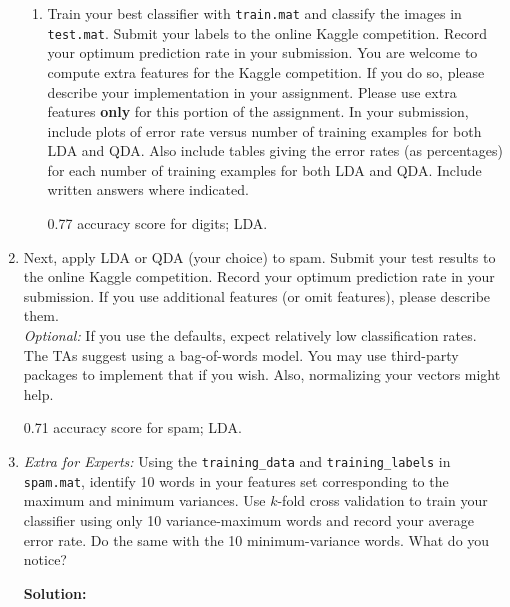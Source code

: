 \documentclass{article}
\newcommand{\solution}{\textbf{Solution: }}
\begin{document}
\begin{enumerate}[label=(\alph*)]
\begin{enumerate}[label=(\roman*)]
      \item Train your best classifier with \texttt{train.mat} and classify the
        images in \texttt{test.mat}. Submit your labels to the online Kaggle
        competition. Record your optimum prediction rate in your
        submission. You are welcome to compute extra features for the Kaggle
        competition. If you do so, please describe your implementation in your
        assignment. Please use extra features \textbf{only} for this portion of
        the assignment. In your submission, include plots of error rate versus
        number of training examples for both LDA and QDA. Also include tables
        giving the error rates (as percentages) for each number of training
        examples for both LDA and QDA. Include written answers where indicated.
        \begin{mdframed}
          0.77 accuracy score for digits; LDA.
        \end{mdframed}

    \end{enumerate}
  \item Next, apply LDA or QDA (your choice) to spam. Submit your test results to the online Kaggle competition. Record your optimum prediction rate in your submission. If you use additional features (or omit features), please describe them. \\

      \emph{Optional:} If you use the defaults, expect relatively low
      classification rates. The TAs suggest using a bag-of-words model. You may
      use third-party packages to implement that if you wish. Also, normalizing
      your vectors might help.

    \begin{mdframed}
      0.71 accuracy score for spam; LDA.
    \end{mdframed}

    \item \emph{Extra for Experts:} Using the \texttt{training\_data} and \texttt{training\_labels} in \texttt{spam.mat}, identify 10 words in your features set corresponding to the maximum and minimum variances. Use $k$-fold cross validation to train your classifier using only 10 variance-maximum words and record your average error rate. Do the same with the 10 minimum-variance words. What do you notice?
    \begin{mdframed} \solution
    \end{mdframed}
\end{enumerate}
\end{document}
